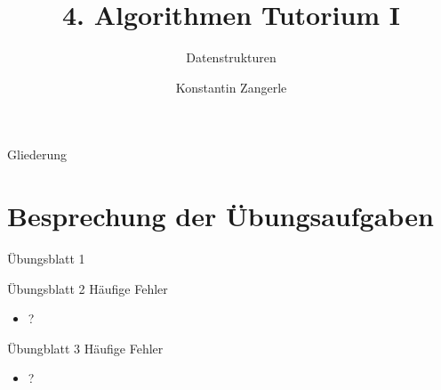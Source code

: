 \documentclass[18pt]{beamer}
\title[Algo I Tut]{4. Algorithmen Tutorium I}
\subtitle{Datenstrukturen}
\author[Zangerle]{Konstantin Zangerle}
\institute{Institut für Theoretische Informatik}
\begin{document}

\begin{frame}
\titlepage
\end{frame}

\begin{frame}{Gliederung}
 \tableofcontents
\end{frame}


\section{Besprechung der Übungsaufgaben}
\begin{frame}{Übungsblatt 1}
\end{frame}

\begin{frame}[fragile]{Übungsblatt 2}
Häufige Fehler
\begin{itemize}
 \item ?
\end{itemize}
\end{frame}

\begin{frame}{Übungblatt 3}
Häufige Fehler
\begin{itemize}
 \item ?
\end{itemize}
\end{frame}
\end{document}
